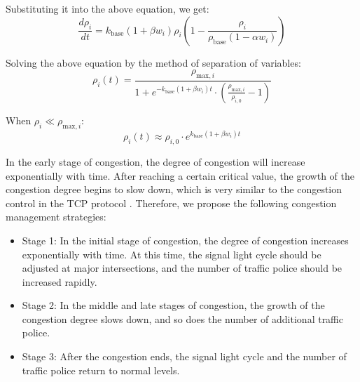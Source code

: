 \documentclass{mcmthesis}
\begin{document}
Substituting it into the above equation, we get:
\begin{equation}
\frac{d\rho_i}{dt} = k_{\text{base}} (1 + \beta w_i) \rho_i \left( 1 - \frac{\rho_i}{\rho_{\text{base}} (1 - \alpha w_i)} \right)
\end{equation}

Solving the above equation by the method of separation of variables:
\begin{equation}
\rho_i(t) = \frac{\rho_{\text{max},i}}{1 + e^{-k_{\text{base}} (1 + \beta w_i) t} \cdot \left( \frac{\rho_{\text{max},i}}{\rho_{i,0}} - 1 \right)}
\end{equation}

When $\rho_i \ll \rho_{\text{max},i}$:
\begin{equation}
\rho_i(t) \approx \rho_{i,0} \cdot e^{k_{\text{base}} (1 + \beta w_i) t}
\end{equation}

In the early stage of congestion, the degree of congestion will increase exponentially with time. After reaching a certain critical value, the growth of the congestion degree begins to slow down, which is very similar to the congestion control in the TCP protocol \cite{Jacobson1988}. Therefore, we propose the following congestion management strategies:

\begin{itemize}
    \item Stage 1: In the initial stage of congestion, the degree of congestion increases exponentially with time. At this time, the signal light cycle should be adjusted at major intersections, and the number of traffic police should be increased rapidly.
    \item Stage 2: In the middle and late stages of congestion, the growth of the congestion degree slows down, and so does the number of additional traffic police.
    \item Stage 3: After the congestion ends, the signal light cycle and the number of traffic police return to normal levels.
\end{itemize}
\end{document}
